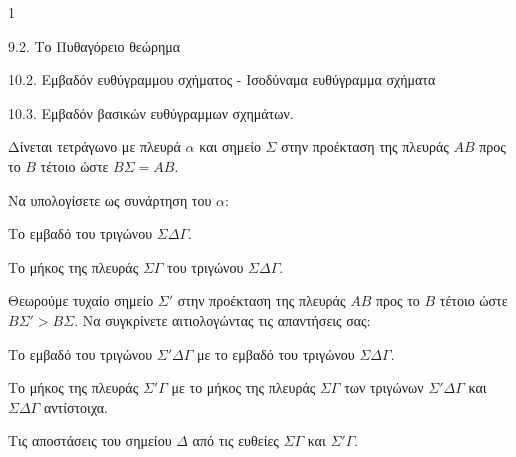 \begin{ylh}{1}
    \item 9.2. Το Πυθαγόρειο θεώρημα
    \item 10.2. Εμβαδόν ευθύγραμμου σχήματος - Ισοδύναμα ευθύγραμμα σχήματα
    \item 10.3. Εμβαδόν βασικών ευθύγραμμων σχημάτων.
\end{ylh}
Δίνεται τετράγωνο με πλευρά $α$ και σημείο $\Sigma$ στην προέκταση της πλευράς $AB$ προς το $B$ τέτοιο ώστε $B\Sigma = AB$.
\begin{alist}
\item Να υπολογίσετε ως συνάρτηση του $α$:
    \begin{rlist}
    \item Το εμβαδό του τριγώνου $\Sigma\Delta\Gamma$.
    \item Το μήκος της πλευράς $\Sigma\Gamma$ του τριγώνου $\Sigma\Delta\Gamma$.
    \end{rlist}
\item Θεωρούμε τυχαίο σημείο $\Sigma'$ στην προέκταση της πλευράς $AB$ προς το $B$ τέτοιο ώστε $B\Sigma' > B\Sigma$. Να συγκρίνετε αιτιολογώντας τις απαντήσεις σας:
    \begin{rlist}
    \item Το εμβαδό του τριγώνου $\Sigma'\Delta\Gamma$ με το εμβαδό του τριγώνου $\Sigma\Delta\Gamma$.
    \item Το μήκος της πλευράς $\Sigma'\Gamma$ με το μήκος της πλευράς $\Sigma\Gamma$ των τριγώνων $\Sigma'\Delta\Gamma$ και $\Sigma\Delta\Gamma$ αντίστοιχα.
    \item Τις αποστάσεις του σημείου $\Delta$ από τις ευθείες $\Sigma\Gamma$ και $\Sigma'\Gamma$.
    \end{rlist}
\end{alist}